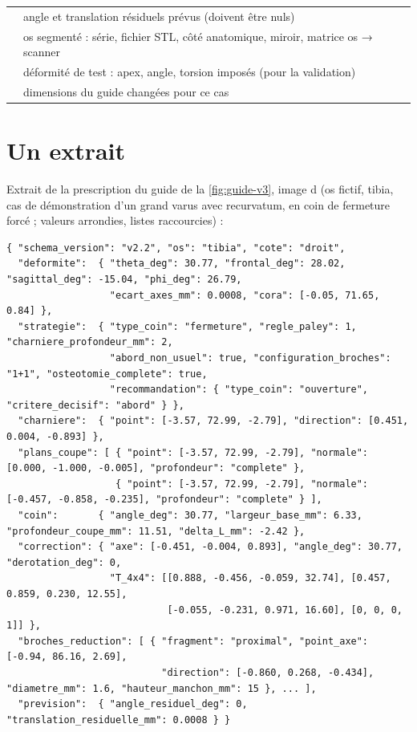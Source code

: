 \begin{table}[htbp]
\begin{tabularx}{\linewidth}{L{3.6cm}Y}
 & angle et translation résiduels prévus (doivent être nuls) \\
 & os segmenté : série, fichier STL, côté anatomique, miroir, matrice os → scanner \\
 & déformité de test : apex, angle, torsion imposés (pour la validation) \\
 & dimensions du guide changées pour ce cas \\
\bottomrule
\end{tabularx}
\end{table}

\section*{Un extrait}

Extrait de la prescription du guide de la \cref{fig:guide-v3}, image d (os fictif, tibia, cas de démonstration d'un
grand varus
avec recurvatum, en coin de fermeture forcé ; valeurs arrondies, listes raccourcies) :

\begin{lstlisting}[language={}, basicstyle=\ttfamily\footnotesize]
{ "schema_version": "v2.2", "os": "tibia", "cote": "droit",
  "deformite":  { "theta_deg": 30.77, "frontal_deg": 28.02, "sagittal_deg": -15.04, "phi_deg": 26.79,
                  "ecart_axes_mm": 0.0008, "cora": [-0.05, 71.65, 0.84] },
  "strategie":  { "type_coin": "fermeture", "regle_paley": 1, "charniere_profondeur_mm": 2,
                  "abord_non_usuel": true, "configuration_broches": "1+1", "osteotomie_complete": true,
                  "recommandation": { "type_coin": "ouverture", "critere_decisif": "abord" } },
  "charniere":  { "point": [-3.57, 72.99, -2.79], "direction": [0.451, 0.004, -0.893] },
  "plans_coupe": [ { "point": [-3.57, 72.99, -2.79], "normale": [0.000, -1.000, -0.005], "profondeur": "complete" },
                   { "point": [-3.57, 72.99, -2.79], "normale": [-0.457, -0.858, -0.235], "profondeur": "complete" } ],
  "coin":       { "angle_deg": 30.77, "largeur_base_mm": 6.33, "profondeur_coupe_mm": 11.51, "delta_L_mm": -2.42 },
  "correction": { "axe": [-0.451, -0.004, 0.893], "angle_deg": 30.77, "derotation_deg": 0,
                  "T_4x4": [[0.888, -0.456, -0.059, 32.74], [0.457, 0.859, 0.230, 12.55],
                            [-0.055, -0.231, 0.971, 16.60], [0, 0, 0, 1]] },
  "broches_reduction": [ { "fragment": "proximal", "point_axe": [-0.94, 86.16, 2.69],
                           "direction": [-0.860, 0.268, -0.434], "diametre_mm": 1.6, "hauteur_manchon_mm": 15 }, ... ],
  "prevision":  { "angle_residuel_deg": 0, "translation_residuelle_mm": 0.0008 } }
\end{lstlisting}

